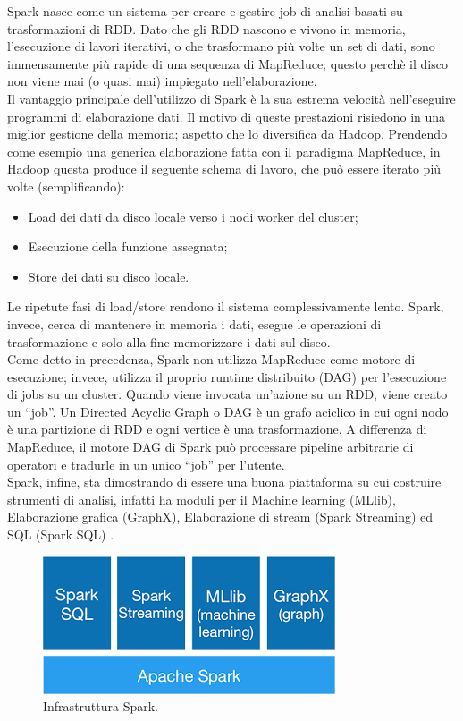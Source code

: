 Spark nasce come un sistema per creare e gestire job di analisi basati su trasformazioni di RDD. Dato che gli RDD nascono e vivono in memoria, l’esecuzione di lavori iterativi, o che trasformano più volte un set di dati, sono immensamente più rapide di una sequenza di MapReduce; questo perchè il disco non viene mai (o quasi mai) impiegato nell'elaborazione.
\\Il vantaggio principale dell'utilizzo di Spark è la sua estrema velocità nell’eseguire programmi di elaborazione dati. Il motivo di queste prestazioni risiedono in una miglior gestione della memoria; aspetto che lo diversifica da Hadoop. Prendendo come esempio una generica elaborazione fatta con il paradigma MapReduce, in Hadoop questa produce il seguente schema di lavoro, che può essere iterato più volte (semplificando):
\begin{itemize}
\item Load dei dati da disco locale verso i nodi worker del cluster;
\item Esecuzione della funzione assegnata;
\item Store dei dati su disco locale.
\end{itemize}
Le ripetute fasi di load/store rendono il sistema complessivamente lento. Spark, invece, cerca di mantenere in memoria i dati, esegue le operazioni di trasformazione e solo alla fine memorizzare i dati sul disco.
\\Come detto in precedenza, Spark non utilizza MapReduce come motore di esecuzione; invece, utilizza il proprio runtime distribuito (DAG) per l’esecuzione di jobs su un cluster. Quando viene invocata un’azione su un RDD, viene creato un “job”. Un Directed Acyclic Graph o DAG è un grafo aciclico in cui ogni nodo è una partizione di RDD e ogni vertice è una trasformazione. A differenza di MapReduce, il motore DAG di Spark può processare pipeline arbitrarie di operatori e tradurle in un unico “job” per l'utente.
\\Spark, infine, sta dimostrando di essere una buona piattaforma su cui costruire strumenti di analisi, infatti ha moduli per il Machine learning (MLlib), Elaborazione grafica (GraphX), Elaborazione di stream (Spark Streaming) ed SQL (Spark SQL) \cite{spark:hadoop}.
\begin{figure}[H]
	\centering
	\includegraphics[width=\textwidth]{images/spark.png}
	\caption{Infrastruttura Spark.}
	\label{fig:sparkOverview}
\end{figure}
